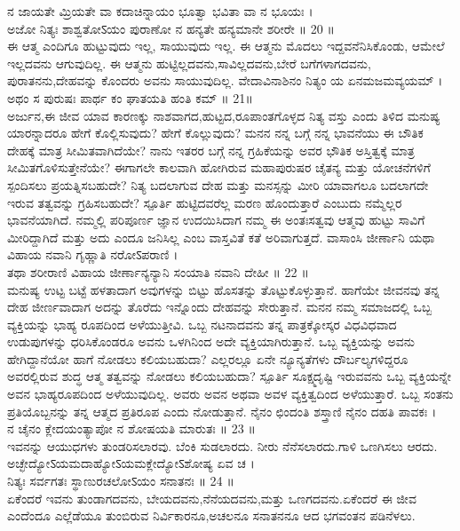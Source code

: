 ನ ಜಾಯತೇ ಮ್ರಿಯತೇ ವಾ ಕದಾಚಿನ್ನಾಯಂ ಭೂತ್ವಾ ಭವಿತಾ ವಾ ನ ಭೂಯಃ ।\\
ಅಜೋ ನಿತ್ಯಃ ಶಾಶ್ವತೋऽಯಂ ಪುರಾಣೋ ನ ಹನ್ಯತೇ ಹನ್ಯಮಾನೇ ಶರೀರೇ ॥ 20 ॥\\
 ಈ ಆತ್ಮ ಎಂದಿಗೂ ಹುಟ್ಟುವುದು ಇಲ್ಲ, ಸಾಯುವುದು ಇಲ್ಲ. ಈ ಆತ್ಮನು ಮೊದಲು ಇದ್ದವನೆನಿಸಿಕೊಂಡು, ಆಮೇಲೆ ಇಲ್ಲದವನು ಆಗುವುದಿಲ್ಲ. ಈ ಆತ್ಮನು ಹುಟ್ಟಿಲ್ಲದವನು,ಸಾವಿಲ್ಲದವನು,ಬೇರೆ ಬಗೆಗಳಾಗದವನು, ಪುರಾತನನು,ದೇಹವನ್ನು ಕೊಂದರು ಅವನು ಸಾಯುವುದಿಲ್ಲ.
ವೇದಾವಿನಾಶಿನಂ ನಿತ್ಯಂ ಯ ಏನಮಜಮವ್ಯಯಮ್ ।\\
ಅಥಂ ಸ ಪುರುಷಃ ಪಾರ್ಥ ಕಂ ಘಾತಯತಿ ಹಂತಿ ಕಮ್ ॥ 21॥\\
 ಅರ್ಜುನ,ಈ ಜೀವ ಯಾವ ಕಾರಣಕ್ಕು ನಾಶವಾಗದ,ಹುಟ್ಟದ,ರೂಪಾಂತಗೊಳ್ಳದ ನಿತ್ಯ ವಸ್ತು ಎಂದು ತಿಳಿದ ಮನುಷ್ಯ ಯಾರನ್ನಾದರೂ ಹೇಗೆ ಕೊಲ್ಲಿಸುವುದು? ಹೇಗೆ ಕೊಲ್ಲುವುದು?
ಮನನ 
 ನನ್ನ ಬಗ್ಗೆ ನನ್ನ ಭಾವನೆಯು ಈ ಬೌತಿಕ ದೇಹಕ್ಕೆ ಮಾತ್ರ ಸೀಮಿತವಾಗಿದೆಯೇ? ನಾನು ಇತರರ ಬಗ್ಗೆ ನನ್ನ ಗ್ರಹಿಕೆಯನ್ನು ಅವರ ಭೌತಿಕ ಅಸ್ತಿತ್ವಕ್ಕೆ ಮಾತ್ರ ಸೀಮಿತಗೊಳಿಸುತ್ತೇನೆಯೇ? ಈಗಾಗಲೇ ಕಾಲವಾಗಿ ಹೋಗಿರುವ ಮಹಾಪುರುಷರ ಚೈತನ್ಯ ಮತ್ತು ಯೋಚನೆಗಳಿಗೆ ಸ್ಪಂದಿಸಲು ಪ್ರಯತ್ನಿಸಬಹುದೇ? ನಿತ್ಯ ಬದಲಾಗುವ ದೇಹ ಮತ್ತು ಮನಸ್ಸನ್ನು ಮೀರಿ ಯಾವಾಗಲೂ ಬದಲಾಗದೇ ಇರುವ ತತ್ವವನ್ನು ಗ್ರಹಿಸಬಹುದೇ?
 ಸ್ಪೂರ್ತಿ 
 ಹುಟ್ಟಿದವರೆಲ್ಲ ಮರಣ ಹೊಂದುತ್ತಾರೆ ಎಂಬುದು ನಮ್ಮೆಲ್ಲರ ಭಾವನೆಯಾಗಿದೆ. ನಮ್ಮಲ್ಲಿ ಪರಿಪೂರ್ಣ ಜ್ಞಾನ ಉದಯಿಸಿದಾಗ ನಮ್ಮ ಈ ಅಂತಃಸತ್ವವು ಆತ್ಮವು ಹುಟ್ಟು ಸಾವಿಗೆ ಮೀರಿದ್ದಾಗಿದೆ ಮತ್ತು ಅದು ಎಂದೂ ಜನಿಸಿಲ್ಲ ಎಂಬ ವಾಸ್ತವಿತೆ ಕತೆ ಅರಿವಾಗುತ್ತದೆ.
ವಾಸಾಂಸಿ ಜೀರ್ಣಾನಿ ಯಥಾ ವಿಹಾಯ ನವಾನಿ ಗೃಹ್ಣಾತಿ ನರೋऽಪರಾಣಿ ।\\
ತಥಾ ಶರೀರಾಣಿ ವಿಹಾಯ ಜೀರ್ಣಾನ್ಯನ್ಯಾನಿ ಸಂಯಾತಿ ನವಾನಿ ದೇಹೀ ॥ 22 ॥\\
 ಮನುಷ್ಯ ಉಟ್ಟ ಬಟ್ಟೆ ಹಳತಾದಾಗ ಅವುಗಳನ್ನು ಬಿಟ್ಟು ಹೊಸತನ್ನು ತೊಟ್ಟುಕೊಳ್ಳುತ್ತಾನೆ. ಹಾಗೆಯೇ ಜೀವನವು ತನ್ನ ದೇಹ ಜೀರ್ಣವಾದಾಗ ಅದನ್ನು ತೊರೆದು ಇನ್ನೊಂದು ದೇಹವನ್ನು ಸೇರುತ್ತಾನೆ.
ಮನನ 
 ನಮ್ಮ ಸಮಾಜದಲ್ಲಿ ಒಬ್ಬ ವ್ಯಕ್ತಿಯನ್ನು ಭಾಹ್ಯ ರೂಪದಿಂದ ಅಳೆಯುತ್ತೀವಿ. ಒಬ್ಬ ನಟನಾದವನು ತನ್ನ ಪಾತ್ರಕ್ಕೋಸ್ಕರ ವಿಧವಿಧವಾದ ಉಡುಪುಗಳನ್ನು ಧರಿಸಿಕೊಂಡರೂ ಅವನು ಒಳಗಿನಿಂದ ಅದೇ ವ್ಯಕ್ತಿಯಾಗಿರುತ್ತಾನೆ. ಒಬ್ಬ ವ್ಯಕ್ತಿಯನ್ನು ಅವನು ಹೇಗಿದ್ದಾನೆಯೋ ಹಾಗೆ ನೋಡಲು ಕಲಿಯಬಹುದಾ? ಎಲ್ಲರಲ್ಲೂ ಏನೇ ನ್ಯೂನ್ಯತೆಗಳು ದೌರ್ಬಲ್ಯಗಳಿದ್ದರೂ ಅವರಲ್ಲಿರುವ ಶುದ್ಧ ಆತ್ಮ ತತ್ವವನ್ನು ನೋಡಲು ಕಲಿಯಬಹುದಾ?
 ಸ್ಪೂರ್ತಿ 
 ಸೂಕ್ಷ್ಮದೃಷ್ಟಿ ಇರುವವನು ಒಬ್ಬ ವ್ಯಕ್ತಿಯನ್ನೇ ಅವನ ಭಾಹ್ಯರೂಪದಿಂದ ಅಳೆಯುವುದಿಲ್ಲ. ಅವರು ಅವನ ಅಥವಾ ಅವಳ ವ್ಯಕ್ತಿತ್ವದಿಂದ ಅಳೆಯುತ್ತಾರೆ. ಒಬ್ಬ ಸಂತನು ಪ್ರತಿಯೊಬ್ಬನನ್ನು ತನ್ನ ಆತ್ಮದ ಪ್ರತಿರೂಪ ಎಂದು ನೋಡುತ್ತಾನೆ.
ನೈನಂ ಛಿಂದಂತಿ ಶಸ್ತ್ರಾಣಿ ನೈನಂ ದಹತಿ ಪಾವಕಃ ।\\
ನ ಚೈನಂ ಕ್ಲೇದಯಂತ್ಯಾಪೋ ನ ಶೋಷಯತಿ ಮಾರುತಃ ॥ 23 ॥\\
 ಇವನನ್ನು ಆಯುಧಗಳು ತುಂಡರಿಸಲಾರವು. ಬೆಂಕಿ ಸುಡಲಾರದು. ನೀರು ನೆನೆಸಲಾರದು.ಗಾಳಿ ಒಣಗಿಸಲು ಆರದು.
ಅಚ್ಛೇದ್ಯೋऽಯಮದಾಹ್ಯೋऽಯಮಕ್ಲೇದ್ಯೋऽಶೋಷ್ಯ ಏವ ಚ ।\\
ನಿತ್ಯಃ ಸರ್ವಗತಃ ಸ್ಥಾಣುರಚಲೋऽಯಂ ಸನಾತನಃ ॥ 24 ॥\\
 ಏಕೆಂದರೆ ಇವನು ತುಂಡಾಗದವನು, ಬೇಯದವನು,ನೆನೆಯದವನು,ಮತ್ತು ಒಣಗದವನು.ಏಕೆಂದರೆ ಈ ಜೀವ ಎಂದೆಂದೂ ಎಲ್ಲೆಡೆಯೂ ತುಂಬಿರುವ ನಿರ್ವಿಕಾರನೂ,ಅಚಲನೂ ಸನಾತನನೂ ಆದ ಭಗವಂತನ ಪಡಿನೆಳಲು.
